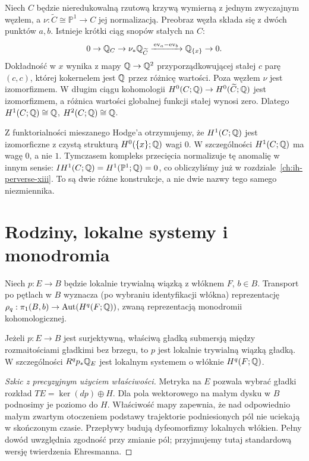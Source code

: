 \begin{przyklad}
\label{ex:nodal-mhs-xiv}
Niech $C$ będzie nieredukowalną rzutową krzywą
wymierną z jednym zwyczajnym węzłem, a
$\nu:\widetilde C\cong\mathbb P^1\to C$ jej normalizacją.
Preobraz węzła składa się z dwóch punktów $a,b$.
Istnieje krótki ciąg snopów stałych na $C$:
\[
0\to\mathbb{Q}_C\to\nu_*\mathbb{Q}_{\widetilde C}
\xrightarrow{\,\mathrm{ev}_a-\mathrm{ev}_b\,}
\mathbb{Q}_{\{x\}}\to0.
\]
Dokładność w $x$ wynika z mapy $\mathbb{Q}\to\mathbb{Q}^2$
przyporządkowującej stałej $c$ parę $(c,c)$,
której kokernelem jest $\mathbb{Q}$ przez różnicę wartości.
Poza węzłem $\nu$ jest izomorfizmem.
W długim ciągu kohomologii $H^0(C;\mathbb{Q})\to
H^0(\widetilde C;\mathbb{Q})$ jest izomorfizmem,
a różnica wartości globalnej funkcji stałej
wynosi zero. Dlatego
$H^1(C;\mathbb{Q})\cong\mathbb{Q}$,
$H^2(C;\mathbb{Q})\cong\mathbb{Q}$.

Z funktorialności mieszanego Hodge'a otrzymujemy,
że $H^1(C;\mathbb{Q})$ jest izomorficzne z czystą
strukturą $H^0(\{x\};\mathbb{Q})$ wagi $0$.
W szczególności $H^1(C;\mathbb{Q})$ ma wagę $0$, a nie $1$.
Tymczasem kompleks przecięcia normalizuje tę
anomalię w innym sensie:
$IH^1(C;\mathbb{Q})=H^1(\mathbb P^1;\mathbb{Q})=0$,
co obliczyliśmy już w rozdziale~\ref{ch:ih-perverse-xiii}.
To są dwie różne konstrukcje, a nie dwie nazwy
tego samego niezmiennika.
\end{przyklad}

\section{Rodziny, lokalne systemy i monodromia}
\begin{definicja}
Niech $p:E\to B$ będzie lokalnie trywialną wiązką
z włóknem $F$, $b\in B$. Transport po pętlach
w $B$ wyznacza (po wybraniu identyfikacji włókna)
reprezentację
$\rho_q:\pi_1(B,b)\to\operatorname{Aut}(H^q(F;\mathbb{Q}))$,
zwaną reprezentacją monodromii kohomologicznej.
\end{definicja}
\begin{twierdzenie}
Jeżeli $p:E\to B$ jest surjektywną, właściwą gładką
submersją między rozmaitościami gładkimi bez brzegu,
to $p$ jest lokalnie trywialną wiązką gładką.
W szczególności $R^qp_*\mathbb{Q}_E$ jest lokalnym
systemem o włóknie $H^q(F;\mathbb{Q})$.
\end{twierdzenie}
\begin{proof}[Szkic z precyzyjnym użyciem właściwości]
Metryka na $E$ pozwala wybrać gładki rozkład
$TE=\ker(dp)\oplus H$. Dla pola wektorowego
na małym dysku w $B$ podnosimy je poziomo do $H$.
Właściwość mapy zapewnia, że nad odpowiednio
małym zwartym otoczeniem podstawy trajektorie
podniesionych pól nie uciekają w skończonym czasie.
Przepływy budują dyfeomorfizmy lokalnych włókien.
Pełny dowód uwzględnia zgodność przy zmianie pól;
przyjmujemy tutaj standardową wersję twierdzenia
Ehresmanna.
\end{proof}

